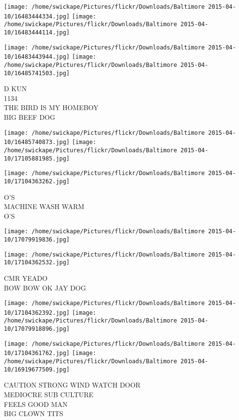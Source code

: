 \documentclass[10pt,letterpaper]{article}
\begin{document}
\texttt{[image: /home/swickape/Pictures/flickr/Downloads/Baltimore 2015-04-10/16483444334.jpg]}
\texttt{[image: /home/swickape/Pictures/flickr/Downloads/Baltimore 2015-04-10/16483444114.jpg]}

\texttt{[image: /home/swickape/Pictures/flickr/Downloads/Baltimore 2015-04-10/16483443944.jpg]}
\texttt{[image: /home/swickape/Pictures/flickr/Downloads/Baltimore 2015-04-10/16485741503.jpg]}

D KUN\\
1134\\
THE BIRD IS MY HOMEBOY\\
BIG BEEF DOG
\pagebreak

\texttt{[image: /home/swickape/Pictures/flickr/Downloads/Baltimore 2015-04-10/16485740873.jpg]}
\texttt{[image: /home/swickape/Pictures/flickr/Downloads/Baltimore 2015-04-10/17105881985.jpg]}

\vspace{0.25in}
\texttt{[image: /home/swickape/Pictures/flickr/Downloads/Baltimore 2015-04-10/17104363262.jpg]}

O'S\\
MACHINE WASH WARM\\
O'S
\pagebreak

\texttt{[image: /home/swickape/Pictures/flickr/Downloads/Baltimore 2015-04-10/17079919836.jpg]}

\vspace{0.25in}
\texttt{[image: /home/swickape/Pictures/flickr/Downloads/Baltimore 2015-04-10/17104362532.jpg]}

CMR YEADO\\
BOW BOW OK JAY DOG
\pagebreak

\texttt{[image: /home/swickape/Pictures/flickr/Downloads/Baltimore 2015-04-10/17104362392.jpg]}
\texttt{[image: /home/swickape/Pictures/flickr/Downloads/Baltimore 2015-04-10/17079918896.jpg]}

\texttt{[image: /home/swickape/Pictures/flickr/Downloads/Baltimore 2015-04-10/17104361762.jpg]}
\texttt{[image: /home/swickape/Pictures/flickr/Downloads/Baltimore 2015-04-10/16919677509.jpg]}

CAUTION STRONG WIND WATCH DOOR\\
MEDIOCRE SUB CULTURE\\
FEELS GOOD MAN\\
BIG CLOWN TITS
\pagebreak
\end{document}
